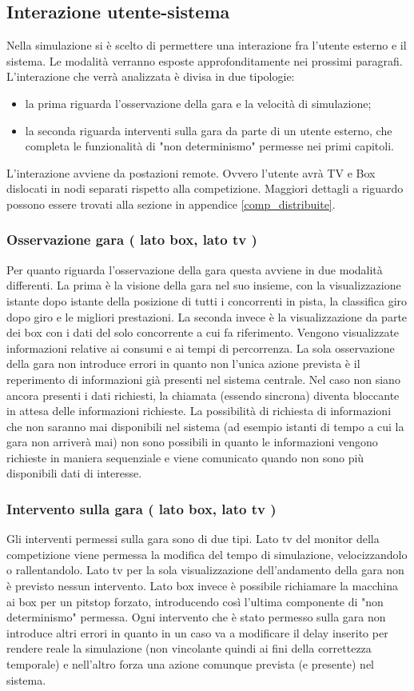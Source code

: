 \subsection{Interazione utente-sistema}
Nella simulazione si è scelto di permettere una interazione fra l'utente esterno
e il sistema. Le modalità verranno esposte approfonditamente nei prossimi
paragrafi. L'interazione che verrà analizzata è divisa in due tipologie:
\begin{itemize}
\item la
prima riguarda l'osservazione della gara e la velocità di simulazione;
\item la
seconda  riguarda interventi sulla gara da parte di un utente esterno,
che completa le funzionalità di "non determinismo" permesse nei primi capitoli.
\end{itemize}
L'interazione avviene da postazioni remote. Ovvero l'utente avrà TV e Box dislocati in nodi separati 
rispetto alla competizione. Maggiori dettagli a riguardo possono essere trovati alla sezione in appendice
\ref{comp_distribuite}.
\subsubsection{Osservazione gara ( lato box, lato tv )}
Per quanto riguarda l'osservazione della gara questa avviene in due modalità
differenti. La prima è la visione della gara nel suo insieme, con la
visualizzazione istante dopo istante della posizione di tutti i concorrenti in
pista, la classifica giro dopo giro e le migliori prestazioni. La seconda invece
è la visualizzazione da parte dei box con i dati del solo concorrente a cui fa
riferimento. Vengono visualizzate informazioni relative ai consumi e ai tempi di
percorrenza. La sola osservazione della gara non introduce errori in quanto non
l'unica azione prevista è il reperimento di informazioni già presenti nel
sistema centrale. Nel caso non siano ancora presenti i dati richiesti, la
chiamata (essendo sincrona) diventa bloccante in attesa delle informazioni
richieste. La possibilità di richiesta di informazioni che non saranno mai
disponibili nel sistema (ad esempio istanti di tempo a cui la gara non arriverà
mai) non sono possibili in quanto le informazioni vengono richieste in
maniera sequenziale e viene comunicato quando non sono più disponibili dati di
interesse.
\subsubsection{Intervento sulla gara ( lato box, lato tv )}
Gli interventi permessi sulla gara sono di due tipi. Lato tv del monitor della competizione
viene permessa la modifica del tempo di simulazione, velocizzandolo o
rallentandolo. Lato tv per la sola visualizzazione dell'andamento della gara non è previsto nessun
intervento. Lato box invece è possibile richiamare la macchina ai box per un
pitstop forzato, introducendo così l'ultima componente di "non determinismo"
permessa.
Ogni intervento che è stato permesso sulla gara non introduce altri errori in
quanto in un caso va a modificare il delay inserito per rendere reale la
simulazione (non vincolante quindi ai fini della correttezza temporale)
e nell'altro forza una azione comunque prevista (e presente) nel
sistema.
